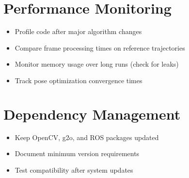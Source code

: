 \section{Performance Monitoring}

\begin{itemize}
    \item Profile code after major algorithm changes
    \item Compare frame processing times on reference trajectories
    \item Monitor memory usage over long runs (check for leaks)
    \item Track pose optimization convergence times
\end{itemize}

\section{Dependency Management}

\begin{itemize}
    \item Keep OpenCV, g2o, and ROS packages updated
    \item Document minimum version requirements
    \item Test compatibility after system updates
\end{itemize}





